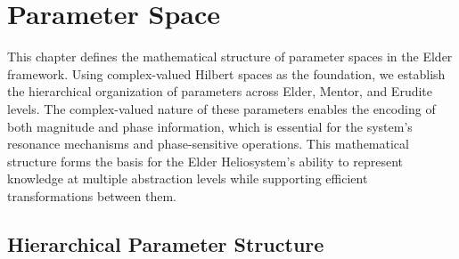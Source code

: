 \chapter{Parameter Space}

\begin{tcolorbox}[colback=blue!5!white,colframe=blue!75!black,title=Chapter Summary]
This chapter defines the mathematical structure of parameter spaces in the Elder framework. Using complex-valued Hilbert spaces as the foundation, we establish the hierarchical organization of parameters across Elder, Mentor, and Erudite levels. The complex-valued nature of these parameters enables the encoding of both magnitude and phase information, which is essential for the system's resonance mechanisms and phase-sensitive operations. This mathematical structure forms the basis for the Elder Heliosystem's ability to represent knowledge at multiple abstraction levels while supporting efficient transformations between them.
\end{tcolorbox}

\section{Hierarchical Parameter Structure}

